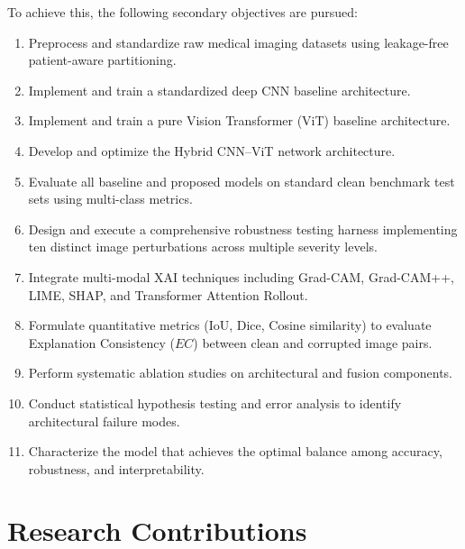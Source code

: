 \documentclass[conference]{IEEEtran}
\begin{document}
To achieve this, the following secondary objectives are pursued:
\begin{enumerate}
    \item Preprocess and standardize raw medical imaging datasets using leakage-free patient-aware partitioning.
    \item Implement and train a standardized deep CNN baseline architecture.
    \item Implement and train a pure Vision Transformer (ViT) baseline architecture.
    \item Develop and optimize the Hybrid CNN--ViT network architecture.
    \item Evaluate all baseline and proposed models on standard clean benchmark test sets using multi-class metrics.
    \item Design and execute a comprehensive robustness testing harness implementing ten distinct image perturbations across multiple severity levels.
    \item Integrate multi-modal XAI techniques including Grad-CAM, Grad-CAM++, LIME, SHAP, and Transformer Attention Rollout.
    \item Formulate quantitative metrics (IoU, Dice, Cosine similarity) to evaluate Explanation Consistency ($EC$) between clean and corrupted image pairs.
    \item Perform systematic ablation studies on architectural and fusion components.
    \item Conduct statistical hypothesis testing and error analysis to identify architectural failure modes.
    \item Characterize the model that achieves the optimal balance among accuracy, robustness, and interpretability.
\end{enumerate}

\section{Research Contributions}
\label{sec:contributions}
\end{document}
